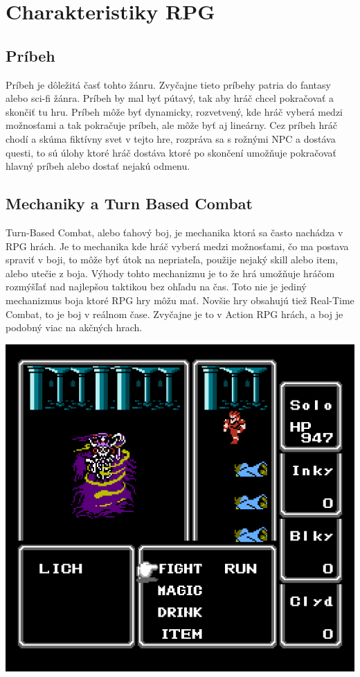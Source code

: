 \documentclass [10pt, twoside, slovak, a4paper] {article}
\begin{document}
\section{Charakteristiky RPG}
\subsection {Príbeh}
Príbeh je dôležitá časť tohto žánru. Zvyčajne tieto príbehy patria do fantasy alebo sci-fi žánra. Príbeh by mal byť pútavý, tak aby hráč chcel pokračovať a skončiť tu hru. Príbeh môže byť dynamicky, rozvetvený, kde hráč vyberá medzi možnosťami a tak pokračuje príbeh, ale môže byť aj lineárny. Cez príbeh hráč chodí a skúma fiktívny svet v tejto hre, rozpráva sa s rožnými NPC a dostáva questi, to sú úlohy ktoré hráč dostáva ktoré po skončení umožňuje pokračovať hlavný príbeh alebo dostať nejakú odmenu.
\subsection{Mechaniky a Turn Based Combat}
Turn-Based Combat, alebo ťahový boj, je mechanika ktorá sa často nachádza v RPG hrách. Je to mechanika kde hráč vyberá medzi možnosťami, čo ma postava spraviť v boji, to môže byť útok na nepriateľa, použije nejaký skill alebo item, alebo utečie z boja. Výhody tohto mechanizmu je to že hrá umožňuje hráčom rozmýšľať nad najlepšou taktikou bez ohľadu na čas. Toto nie je jediný mechanizmus boja ktoré RPG hry môžu mať. Novšie hry obsahujú tiež Real-Time Combat, to je boj v reálnom čase. Zvyčajne je to v Action RPG hrách, a boj je podobný viac na akčných hrach.



\includegraphics[scale=0.5]{FFTBC.png}
\end{document}
